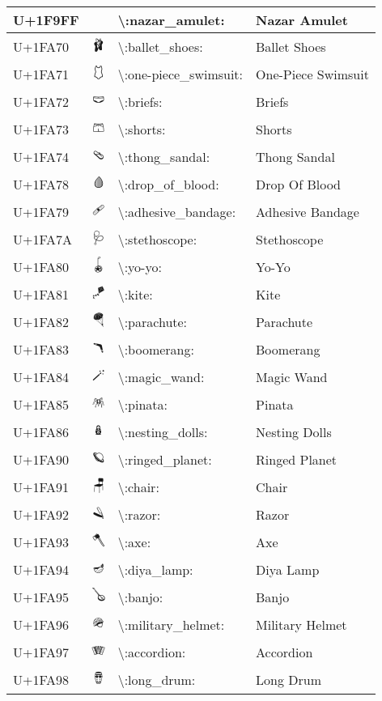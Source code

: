 \begin{table}[h]
\begin{tabulary}{\linewidth}{|L|L|L|L|}
\hline
U+1F9FF & 🧿 & {\textbackslash}:nazar\_amulet: & Nazar Amulet \\
\hline
U+1FA70 & 🩰 & {\textbackslash}:ballet\_shoes: & Ballet Shoes \\
\hline
U+1FA71 & 🩱 & {\textbackslash}:one-piece\_swimsuit: & One-Piece Swimsuit \\
\hline
U+1FA72 & 🩲 & {\textbackslash}:briefs: & Briefs \\
\hline
U+1FA73 & 🩳 & {\textbackslash}:shorts: & Shorts \\
\hline
U+1FA74 & 🩴 & {\textbackslash}:thong\_sandal: & Thong Sandal \\
\hline
U+1FA78 & 🩸 & {\textbackslash}:drop\_of\_blood: & Drop Of Blood \\
\hline
U+1FA79 & 🩹 & {\textbackslash}:adhesive\_bandage: & Adhesive Bandage \\
\hline
U+1FA7A & 🩺 & {\textbackslash}:stethoscope: & Stethoscope \\
\hline
U+1FA80 & 🪀 & {\textbackslash}:yo-yo: & Yo-Yo \\
\hline
U+1FA81 & 🪁 & {\textbackslash}:kite: & Kite \\
\hline
U+1FA82 & 🪂 & {\textbackslash}:parachute: & Parachute \\
\hline
U+1FA83 & 🪃 & {\textbackslash}:boomerang: & Boomerang \\
\hline
U+1FA84 & 🪄 & {\textbackslash}:magic\_wand: & Magic Wand \\
\hline
U+1FA85 & 🪅 & {\textbackslash}:pinata: & Pinata \\
\hline
U+1FA86 & 🪆 & {\textbackslash}:nesting\_dolls: & Nesting Dolls \\
\hline
U+1FA90 & 🪐 & {\textbackslash}:ringed\_planet: & Ringed Planet \\
\hline
U+1FA91 & 🪑 & {\textbackslash}:chair: & Chair \\
\hline
U+1FA92 & 🪒 & {\textbackslash}:razor: & Razor \\
\hline
U+1FA93 & 🪓 & {\textbackslash}:axe: & Axe \\
\hline
U+1FA94 & 🪔 & {\textbackslash}:diya\_lamp: & Diya Lamp \\
\hline
U+1FA95 & 🪕 & {\textbackslash}:banjo: & Banjo \\
\hline
U+1FA96 & 🪖 & {\textbackslash}:military\_helmet: & Military Helmet \\
\hline
U+1FA97 & 🪗 & {\textbackslash}:accordion: & Accordion \\
\hline
U+1FA98 & 🪘 & {\textbackslash}:long\_drum: & Long Drum \\

\end{tabulary}
\end{table}
